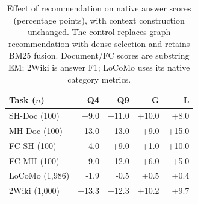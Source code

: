 \begin{table}[ht]
\centering
\small
\setlength{\tabcolsep}{3pt}
\begin{tabular}{lrrrr}
\toprule
Task ($n$) & Q4 & Q9 & G & L \\
\midrule
SH-Doc (100) & +9.0 & +11.0 & +10.0 & +8.0 \\
MH-Doc (100) & +13.0 & +13.0 & +9.0 & +15.0 \\
FC-SH (100) & +4.0 & +9.0 & +1.0 & +10.0 \\
FC-MH (100) & +9.0 & +12.0 & +6.0 & +5.0 \\
LoCoMo (1,986) & -1.9 & -0.5 & +0.5 & +0.4 \\
2Wiki (1,000) & +13.3 & +12.3 & +10.2 & +9.7 \\
\bottomrule
\end{tabular}
\caption{Effect of recommendation on native answer scores (percentage points), with context construction unchanged. The control replaces graph recommendation with dense selection and retains BM25 fusion. Document/FC scores are substring EM; 2Wiki is answer F1; LoCoMo uses its native category metrics.}
\label{tab:recommendation-effect}
\end{table}
